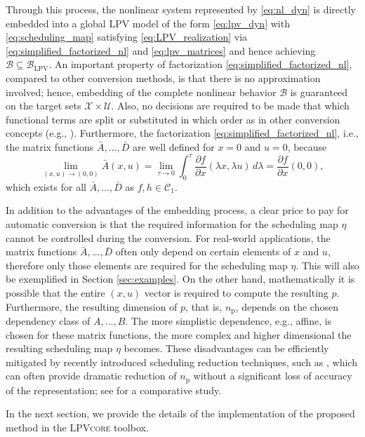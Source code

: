 Through this process, the nonlinear system represented by \eqref{eq:nl_dyn} is directly embedded into a global LPV model of the form \eqref{eq:lpv_dyn} with \eqref{eq:scheduling_map} satisfying \eqref{eq:LPV_realization} via \eqref{eq:simplified_factorized_nl} and \eqref{eq:lpv_matrices} and hence achieving $\mathcal{B} \subseteq \mathcal{B}_{\text{LPV}}$.
An important property of factorization \eqref{eq:simplified_factorized_nl}, compared to other conversion methods, is that there is no approximation involved; hence, embedding of the complete nonlinear behavior $\mathcal{B}$ is guaranteed on the target sets $\mathcal{X}\times\mathcal{U}$. Also, no decisions are required to be made that which functional terms are split or substituted in which order as in other conversion concepts (e.g., \cite{Kwiatkowski06}). Furthermore, the factorization \eqref{eq:simplified_factorized_nl}, i.e., the matrix functions $\bar{A},\ldots,\bar{D}$ are well defined for $x=0$ and $u=0$, because \[\lim_{(x,u)\rightarrow (0,0)} \bar{A}(x,u)=\lim_{\tau \rightarrow 0} \int_{0}^{\tau} \! \frac{\partial f}{\partial x}(\lambda x, \lambda u) \, d \lambda = \frac{\partial f}{\partial x}(0, 0),\]
which exists for all $\bar{A},\ldots,\bar{D}$ as $f,h\in\mathcal{C}_1$. 

In addition to the advantages of the embedding process, a clear price to pay for automatic conversion is that the required information for the scheduling map $\eta$ cannot be controlled during the conversion. For real-world applications, the matrix functions $\bar{A},\ldots,\bar{D}$ often only depend on certain elements of $x$ and $u$, therefore only those elements are required for the scheduling map $\eta$. This will also be exemplified in Section \ref{sec:examples}. On the other hand, mathematically it is possible that the entire $(x,u)$ vector is required to compute the resulting $p$. Furthermore, the resulting dimension of $p$, that is, $n_\mathrm{p}$, depends on the chosen dependency class of $A,\ldots,B$. The more simplistic dependence, e.g., affine, is chosen for these matrix functions, the more complex and higher dimensional the resulting scheduling map $\eta$ becomes. These disadvantages can be efficiently mitigated by recently introduced scheduling reduction techniques, such as \cite{Toth20ACC,Toth16TCST,8431912}, which can often provide dramatic reduction of $n_\mathrm{p}$ without a significant loss of accuracy of the representation; see \cite{olucha2024reductionlinearparametervaryingstatespace} for a comparative study.         

In the next section, we provide the details of the implementation of the proposed method in the \textsc{LPVcore} toolbox.